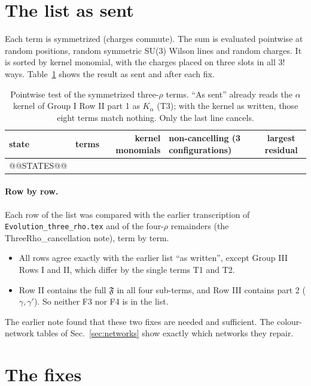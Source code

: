 \documentclass[10pt]{article}
\numberwithin{equation}{section}
\begin{document}
\section{The list as sent}\label{sec:sent}
Each term is symmetrized (charges commute). The sum is evaluated pointwise at random positions, random symmetric SU(3) Wilson lines and random charges. It is sorted by kernel monomial, with the charges placed on three slots in all $3!$ ways. Table~\ref{tab:states} shows the result as sent and after each fix.
\begin{table}[H]
\centering\small
\begin{tabular}{@{}l r r l c@{}}
state & terms & kernel monomials & non-cancelling (3 configurations) & largest residual\\ \hline
@@STATES@@
\end{tabular}
\caption{Pointwise test of the symmetrized three-$\rho$ terms. ``As sent'' already reads the $\alpha$ kernel of Group I Row II part 1 as $K_\alpha$ (T3); with the kernel as written, those eight terms match nothing. Only the last line cancels.}
\label{tab:states}
\end{table}
\paragraph{Row by row.} Each row of the list was compared with the earlier transcription of \texttt{Evolution\_three\_rho.tex} and of the four-$\rho$ remainders (the ThreeRho\_cancellation note), term by term.
\begin{itemize}
\item All rows agree exactly with the earlier list ``as written'', except Group III Rows I and II, which differ by the single terms T1 and T2.
\item Row II contains the full $\mathfrak F$ in all four sub-terms, and Row III contains part 2 ($\gamma,\gamma'$). So neither F3 nor F4 is in the list.
\end{itemize}
The earlier note found that these two fixes are needed and sufficient. The colour-network tables of Sec.~\ref{sec:networks} show exactly which networks they repair.

\section{The fixes}\label{sec:fixes}
\end{document}
